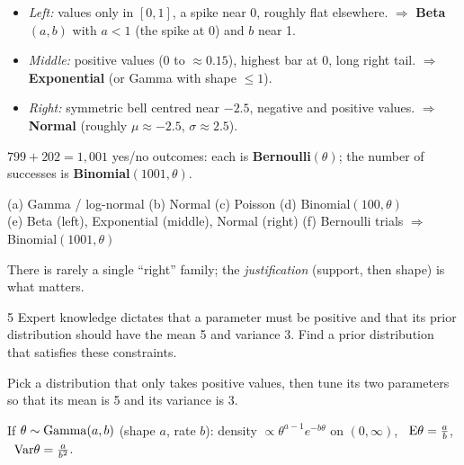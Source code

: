 \documentclass[11pt]{article}
\begin{document}
\begin{itemize}
\item \emph{Left:} values only in $[0,1]$, a spike near 0, roughly flat elsewhere.
$\Rightarrow$ \textbf{Beta}$(a,b)$ with $a<1$ (the spike at 0) and $b$ near 1.
\item \emph{Middle:} positive values (0 to $\approx0.15$), highest bar at 0, long right tail.
$\Rightarrow$ \textbf{Exponential} (or Gamma with shape $\le1$).
\item \emph{Right:} symmetric bell centred near $-2.5$, negative and positive values.
$\Rightarrow$ \textbf{Normal} (roughly $\mu\approx-2.5$, $\sigma\approx2.5$).
\end{itemize}

$799+202=1{,}001$ yes/no outcomes: each is \textbf{Bernoulli}$(\theta)$; the number of successes is \textbf{Binomial}$(1001,\theta)$.

\begin{answer}
(a) Gamma / log-normal \quad (b) Normal \quad (c) Poisson \quad (d) Binomial$(100,\theta)$\\
(e) Beta (left), Exponential (middle), Normal (right) \quad (f) Bernoulli trials $\Rightarrow$ Binomial$(1001,\theta)$
\end{answer}

\begin{takeaway}
There is rarely a single ``right'' family; the \emph{justification} (support, then shape) is what matters.
\end{takeaway}


\begin{problem}{5}
Expert knowledge dictates that a parameter must be positive and that its prior distribution should have the mean 5 and variance 3. Find a prior distribution that satisfies these constraints.
\end{problem}

\begin{restate}
Pick a distribution that only takes positive values, then tune its two parameters so that its mean is 5 and its variance is 3.
\end{restate}

\begin{recall}
If $\theta\sim\mathrm{Gamma}(a,b)$ (shape $a$, rate $b$): density $\propto\theta^{a-1}e^{-b\theta}$ on $(0,\infty)$, \ $\mathrm{E}\theta=\frac ab$, \ $\mathrm{Var}\theta=\frac a{b^2}$.
\end{recall}
\end{document}
